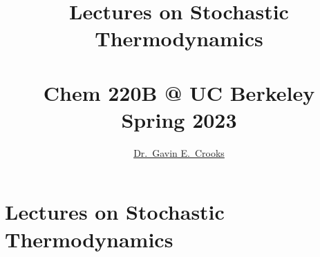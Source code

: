 \documentclass[article,notes]{bespoke6}
\newcommand{\thetitle}{Lectures on Stochastic Thermodynamics}
\newcommand{\theauthor}{Dr.\ Gavin E.\ Crooks}
\newcommand{\self}{_disorder}			%
\begin{document}

\nocite{}


\title{\color{\titlecolor}\thetitle \\ ~  \\ Chem 220B @ UC Berkeley \\ Spring 2023 }
\author{\href{http://threeplusone.com/}{\theauthor}}
\date{}
\maketitle
\thispagestyle{empty}

\tableofcontents
\clearpage
\section{Lectures on Stochastic Thermodynamics}
\end{document}
